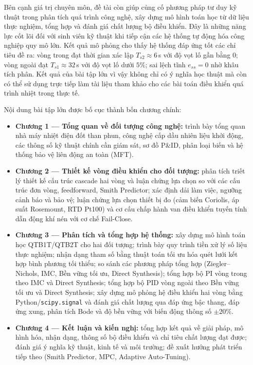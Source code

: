 \documentclass[../main.tex]{subfiles}
\begin{document}
Bên cạnh giá trị chuyên môn, đề tài còn giúp củng cố phương pháp tư duy kỹ thuật trong phân tích quá trình công nghệ, xây dựng mô hình toán học từ dữ liệu thực nghiệm, tổng hợp và đánh giá chất lượng bộ điều khiển. Đây là những năng lực cốt lõi đối với sinh viên kỹ thuật khi tiếp cận các hệ thống tự động hóa công nghiệp quy mô lớn. Kết quả mô phỏng cho thấy hệ thống đáp ứng tốt các chỉ tiêu đề ra: vòng trong đạt thời gian xác lập $T_{s2} \approx 6$\,s với độ vọt lố gần bằng 0; vòng ngoài đạt $T_{s1} \approx 32$\,s với độ vọt lố dưới $5\%$; sai lệch tĩnh $e_{ss} = 0$ nhờ khâu tích phân. Kết quả của bài tập lớn vì vậy không chỉ có ý nghĩa học thuật mà còn có thể sử dụng trực tiếp làm tài liệu tham khảo cho các bài toán điều khiển quá trình nhiệt trong thực tế.

Nội dung bài tập lớn được bố cục thành bốn chương chính:
\begin{itemize}[noitemsep,topsep=5pt]
    \item \textbf{Chương 1 --- Tổng quan về đối tượng công nghệ:} trình bày tổng quan nhà máy nhiệt điện đốt than phun, công nghệ cấp dầu nhiên liệu khởi động, các thông số kỹ thuật chính cần giám sát, sơ đồ P\&ID, phân loại biến và hệ thống bảo vệ liên động an toàn (MFT).
    \item \textbf{Chương 2 --- Thiết kế vòng điều khiển cho đối tượng:} phân tích triết lý thiết kế cấu trúc cascade hai vòng và luận chứng lựa chọn so với các cấu trúc đơn vòng, feedforward, Smith Predictor; xác định dải làm việc, ngưỡng cảnh báo và bảo vệ; luận chứng lựa chọn thiết bị đo (cảm biến Coriolis, áp suất Rosemount, RTD Pt100) và cơ cấu chấp hành van điều khiển tuyến tính dẫn động khí nén với cơ chế Fail-Close.
    \item \textbf{Chương 3 --- Phân tích và tổng hợp hệ thống:} xây dựng mô hình toán học QTB1T/QTB2T cho hai đối tượng; trình bày quy trình tiền xử lý số liệu thực nghiệm; nhận dạng tham số bằng thuật toán tối ưu hóa quét lưới kết hợp bình phương tối thiểu; so sánh các phương pháp tổng hợp (Ziegler--Nichols, IMC, Bền vững tối ưu, Direct Synthesis); tổng hợp bộ PI vòng trong theo IMC và Direct Synthesis; tổng hợp bộ PID vòng ngoài theo Bền vững tối ưu và Direct Synthesis; xây dựng mô phỏng hệ điều khiển hai vòng bằng Python/\texttt{scipy.signal} và đánh giá chất lượng qua đáp ứng bậc thang, đáp ứng xung, phân tích Bode và độ bền vững với biến động thông số $\pm 20\%$.
    \item \textbf{Chương 4 --- Kết luận và kiến nghị:} tổng hợp kết quả về giải pháp, mô hình hóa, nhận dạng, thông số bộ điều khiển và chỉ tiêu chất lượng đạt được; đánh giá ý nghĩa kỹ thuật, kinh tế và môi trường; đề xuất hướng phát triển tiếp theo (Smith Predictor, MPC, Adaptive Auto-Tuning).
\end{itemize}

\vspace{1cm}
\end{document}
